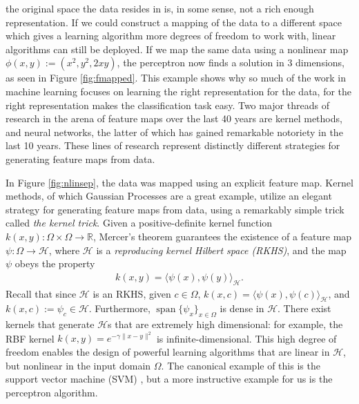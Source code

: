 \documentclass[letterpaper,12pt,peerreviewca,draftcls]{IEEEtran}
\newcommand{\R}{\mathbb{R}}
\def\l{\langle}
\def\r{\rangle}
\newcommand{\fspace}{\mathcal{H}}
\newcommand{\fmap}{\psi}
\newcommand{\kernel}{k}
\newcommand{\dom}{\Omega}
\newcommand{\eqlabel}[1]{\label{eq:#1}}
\def\l{\langle}
\def\r{\rangle}
\DeclareMathOperator{\Span}{span}
\begin{document}
the original space the data resides in is, in some sense, not a rich enough representation. If we could construct a mapping of the data to a
different space which gives a learning algorithm more degrees of freedom to work with, linear algorithms can still be deployed. 
If we map the same data using a nonlinear map $\phi(x,y):= (x^2, y^2, 2xy)$, the perceptron now finds a solution
in 3 dimensions, as seen in Figure \ref{fig:fmapped}. This example shows why so much of the work in machine learning focuses on 
learning the right representation for the data, for the right representation makes the classification task easy. Two major threads of 
research in the arena of feature maps over the last 40 years are kernel methods, and neural networks, the latter
of which has gained remarkable notoriety in the last 10 years. 
These lines of research represent distinctly different strategies for generating feature maps from data. 

In Figure \ref{fig:nlinsep}, the data was mapped using an explicit feature map. Kernel methods, of which Gaussian Processes are a great example, utilize an elegant strategy for generating
feature maps from data, using a remarkably simple trick called \emph{the kernel trick}. Given a positive-definite kernel function 
$\kernel(x,y):\dom\times\dom\to\R$, Mercer's theorem guarantees the existence of a feature map $\fmap:\dom\to\fspace$, where $\fspace$
is a \emph{reproducing kernel Hilbert space (RKHS)}, and the map $\fmap$ obeys the property 
\begin{align}\eqlabel{kmap}
 \kernel(x,y) = \l\fmap(x), \fmap(y)\r_{\fspace}.
\end{align}
Recall that since $\fspace$ is an RKHS, given $c\in\dom$, $\kernel(x, c) = \l\fmap(x), \fmap(c)\r_{\fspace}$, 
and $\kernel(x, c) := \fmap_c\in\fspace$. Furthermore, $\Span\{\fmap_x\}_{x\in\dom}$ is dense in $\fspace$. There exist kernels 
that generate $\fspace$s that are extremely high dimensional: for example, the RBF kernel $\kernel(x,y) = e^{-\gamma\|x-y\|^2}$
is infinite-dimensional. This high degree of freedom enables the design of powerful learning algorithms that are linear in $\fspace$,
but nonlinear in the input domain $\dom$. The canonical example of this is the support vector machine (SVM) \cite{cortes1995support},
but a more instructive example for us is the perceptron algorithm. 
\end{document}
